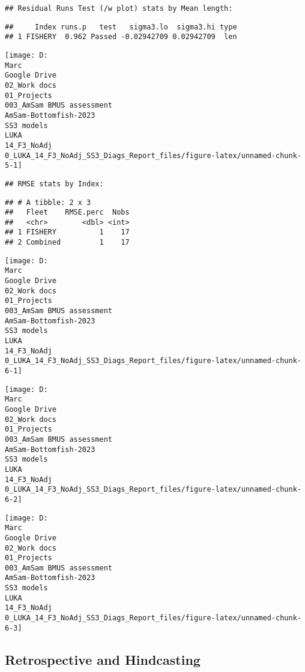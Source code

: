 \documentclass[
]{article}
\begin{document}
\begin{verbatim}
## Residual Runs Test (/w plot) stats by Mean length:
\end{verbatim}

\begin{verbatim}
##     Index runs.p   test   sigma3.lo  sigma3.hi type
## 1 FISHERY  0.962 Passed -0.02942709 0.02942709  len
\end{verbatim}

\begin{center}\texttt{[image: D:\\Marc\\Google Drive\\02\_Work docs\\01\_Projects\\003\_AmSam BMUS assessment\\AmSam-Bottomfish-2023\\SS3 models\\LUKA\\14\_F3\_NoAdj\\0\_LUKA\_14\_F3\_NoAdj\_SS3\_Diags\_Report\_files/figure-latex/unnamed-chunk-5-1]} \end{center}

\begin{verbatim}
## RMSE stats by Index:
\end{verbatim}

\begin{verbatim}
## # A tibble: 2 x 3
##   Fleet    RMSE.perc  Nobs
##   <chr>        <dbl> <int>
## 1 FISHERY          1    17
## 2 Combined         1    17
\end{verbatim}

\begin{center}\texttt{[image: D:\\Marc\\Google Drive\\02\_Work docs\\01\_Projects\\003\_AmSam BMUS assessment\\AmSam-Bottomfish-2023\\SS3 models\\LUKA\\14\_F3\_NoAdj\\0\_LUKA\_14\_F3\_NoAdj\_SS3\_Diags\_Report\_files/figure-latex/unnamed-chunk-6-1]} \end{center}

\begin{center}\texttt{[image: D:\\Marc\\Google Drive\\02\_Work docs\\01\_Projects\\003\_AmSam BMUS assessment\\AmSam-Bottomfish-2023\\SS3 models\\LUKA\\14\_F3\_NoAdj\\0\_LUKA\_14\_F3\_NoAdj\_SS3\_Diags\_Report\_files/figure-latex/unnamed-chunk-6-2]} \end{center}

\begin{center}\texttt{[image: D:\\Marc\\Google Drive\\02\_Work docs\\01\_Projects\\003\_AmSam BMUS assessment\\AmSam-Bottomfish-2023\\SS3 models\\LUKA\\14\_F3\_NoAdj\\0\_LUKA\_14\_F3\_NoAdj\_SS3\_Diags\_Report\_files/figure-latex/unnamed-chunk-6-3]} \end{center}

\hypertarget{retrospective-and-hindcasting}{%
\subsection{Retrospective and
Hindcasting}\label{retrospective-and-hindcasting}}
\end{document}
